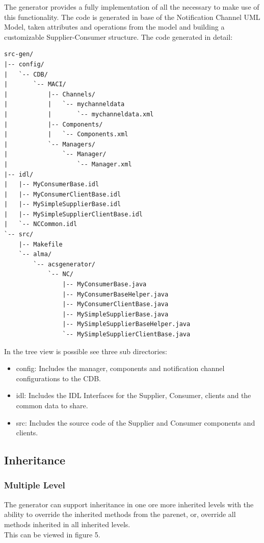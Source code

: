 The generator provides a fully implementation of all the necessary to make use
of this functionality. The code is generated in base of the Notification
Channel UML Model, taken attributes and operations from the model and building
a customizable Supplier-Consumer structure. The code generated in detail:
\begin{verbatim}
src-gen/
|-- config/
|   `-- CDB/
|       `-- MACI/
|           |-- Channels/
|           |   `-- mychanneldata
|           |       `-- mychanneldata.xml
|           |-- Components/
|           |   `-- Components.xml
|           `-- Managers/
|               `-- Manager/
|                   `-- Manager.xml
|-- idl/
|   |-- MyConsumerBase.idl
|   |-- MyConsumerClientBase.idl
|   |-- MySimpleSupplierBase.idl
|   |-- MySimpleSupplierClientBase.idl
|   `-- NCCommon.idl
`-- src/
    |-- Makefile
    `-- alma/
        `-- acsgenerator/
            `-- NC/
                |-- MyConsumerBase.java
                |-- MyConsumerBaseHelper.java
                |-- MyConsumerClientBase.java
                |-- MySimpleSupplierBase.java
                |-- MySimpleSupplierBaseHelper.java
                `-- MySimpleSupplierClientBase.java
\end{verbatim}

In the tree view is possible see three sub directories:
\begin{itemize}
 	 \item config: Includes the manager, components and notification channel configurations to the CDB.
 	 \item idl: Includes the IDL Interfaces for the Supplier, Consumer, clients and the common data to share.
 	 \item src: Includes the source code of the Supplier and Consumer components and clients.
\end{itemize}


\subsection{Inheritance}

\subsubsection{Multiple Level}
The generator can support inheritance in one ore more inherited levels
with the ability to override the inherited methods from the parenet, or,
override all methods inherited in all inherited levels.\\
This can be viewed in figure 5.

